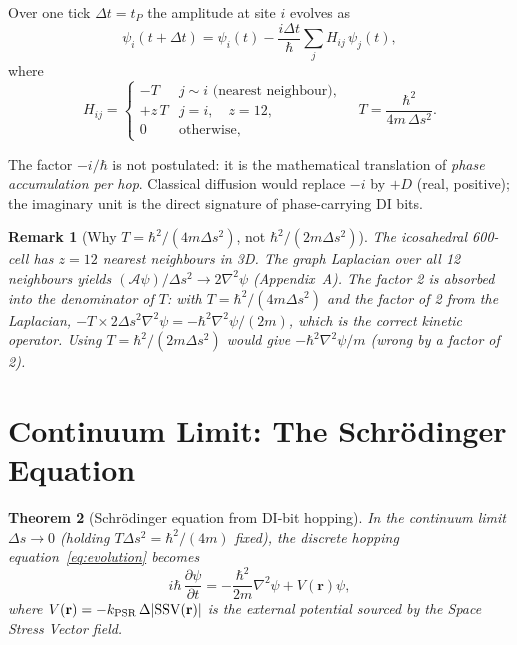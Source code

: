 \documentclass[11pt,a4paper]{article}
\newtheorem{theorem}{Theorem}[section]
\newtheorem{remark}[theorem]{Remark}
\newcommand{\tP}{t_P}
\newcommand{\SSV}{\mathrm{SSV}}
\begin{document}
Over one tick $\Delta t = \tP$ the amplitude at site $i$ evolves as
\begin{equation}
\psi_i(t+\Delta t) = \psi_i(t) - \frac{i\Delta t}{\hbar}
\sum_j H_{ij}\,\psi_j(t),
\label{eq:evolution}
\end{equation}
where
\begin{equation}
H_{ij} = \begin{cases}
-T & j \sim i \text{ (nearest neighbour)}, \\
+z\,T & j = i, \quad z = 12, \\
0 & \text{otherwise},
\end{cases}
\quad T = \frac{\hbar^2}{4m\,\Delta s^2}.
\label{eq:H}
\end{equation}

The factor $-i/\hbar$ is not postulated: it is the mathematical
translation of \emph{phase accumulation per hop}.  Classical diffusion
would replace $-i$ by $+D$ (real, positive); the imaginary unit is the
direct signature of phase-carrying DI bits.

\begin{remark}[Why $T = \hbar^2/(4m\Delta s^2)$, not $\hbar^2/(2m\Delta s^2)$]
The icosahedral 600-cell has $z=12$ nearest neighbours in 3D.
The graph Laplacian over all 12 neighbours yields
$(\mathcal{A}\psi)/\Delta s^2 \to 2\nabla^2\psi$ (Appendix~A).
The factor 2 is absorbed into the denominator of $T$: with
$T = \hbar^2/(4m\Delta s^2)$ and the factor of 2 from the Laplacian,
$-T \times 2\Delta s^2\nabla^2\psi = -\hbar^2\nabla^2\psi/(2m)$,
which is the correct kinetic operator.
Using $T = \hbar^2/(2m\Delta s^2)$ would give $-\hbar^2\nabla^2\psi/m$
(wrong by a factor of 2).
\end{remark}

\section{Continuum Limit: The Schr\"{o}dinger Equation}

\begin{theorem}[Schr\"{o}dinger equation from DI-bit hopping]
\label{thm:schrodinger}
In the continuum limit $\Delta s \to 0$ (holding $T\Delta s^2
= \hbar^2/(4m)$ fixed), the discrete hopping equation~\eqref{eq:evolution}
becomes
\begin{equation}
i\hbar\,\frac{\partial\psi}{\partial t}
= -\frac{\hbar^2}{2m}\nabla^2\psi + V(\mathbf{r})\psi,
\label{eq:Schrodinger}
\end{equation}
where $V(\mathbf{r}) = -k_{\rm PSR}\,\Delta|\SSV(\mathbf{r})|$ is
the external potential sourced by the Space Stress Vector field.
\end{theorem}
\end{document}
